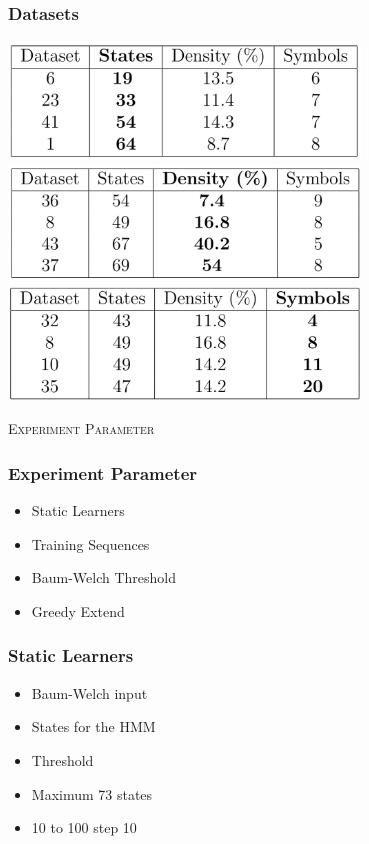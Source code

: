 \begin{frame}
	\frametitle{Datasets}
	\begin{centering}
		\includegraphics[width=0.7\textwidth]{images/table1.png}\\
		\includegraphics[width=0.7\textwidth]{images/table2.png}\\
		\includegraphics[width=0.7\textwidth]{images/table3.png}\\
	\end{centering}
\end{frame}


\begin{frame}
	\center \huge \scshape Experiment Parameter
\end{frame}

\begin{frame}
	\frametitle{Experiment Parameter}
	\begin{itemize}
		\item Static Learners
		\item Training Sequences
		\item Baum-Welch Threshold
		\item Greedy Extend
	\end{itemize}
\end{frame}


\begin{frame}
	\frametitle{Static Learners}
	\begin{itemize}
		\item Baum-Welch input
		\item States for the HMM
		\item Threshold
		\item Maximum 73 states
		\item 10 to 100 step 10
	\end{itemize}
\end{frame}



